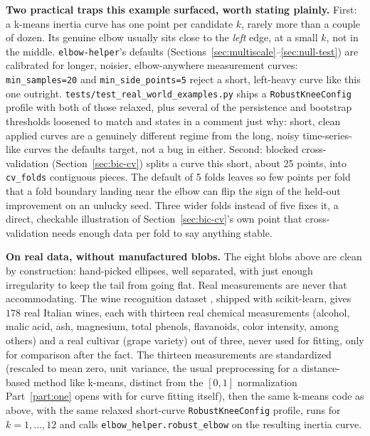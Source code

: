 \documentclass[11pt]{article}
\newcommand{\code}[1]{\texttt{#1}}
\begin{document}
\textbf{Two practical traps this example surfaced, worth stating plainly.}
First: a k-means inertia curve has one point per candidate $k$, rarely more
than a couple of dozen. Its genuine elbow usually sits close to the
\emph{left} edge, at a small $k$, not in the middle. \code{elbow-helper}'s
defaults (Sections~\ref{sec:multiscale}--\ref{sec:null-test}) are calibrated
for longer, noisier, elbow-anywhere measurement curves:
\code{min\_samples=20} and \code{min\_side\_points=5} reject a short,
left-heavy curve like this one outright.
\code{tests/test\_real\_world\_examples.py} ships a \code{RobustKneeConfig}
profile with both of those relaxed, plus several of the persistence and
bootstrap thresholds loosened to match and states in a comment just why:
short, clean applied curves are a genuinely different regime from the long,
noisy time-series-like curves the defaults target, not a bug in either.
Second: blocked cross-validation (Section~\ref{sec:bic-cv}) splits a curve
this short, about 25 points, into \code{cv\_folds} contiguous pieces. The
default of 5 folds leaves so few points per fold that a fold boundary
landing near the elbow can flip the sign of the held-out improvement on an
unlucky seed. Three wider folds instead of five fixes it, a direct,
checkable illustration of Section~\ref{sec:bic-cv}'s own point that
cross-validation needs enough data per fold to say anything stable.

\textbf{On real data, without manufactured blobs.} The eight blobs above
are clean by construction: hand-picked ellipses, well separated, with
just enough irregularity to keep the tail from going flat. Real
measurements are never that accommodating. The wine recognition
dataset \citep{aeberhard1992}, shipped with scikit-learn, gives $178$
real Italian wines, each with thirteen real chemical measurements
(alcohol, malic acid, ash, magnesium, total phenols, flavanoids, color
intensity, among others) and a real cultivar (grape variety) out of
three, never used for fitting, only for comparison after the fact. The
thirteen measurements are standardized (rescaled to mean zero, unit
variance, the usual preprocessing for a distance-based method like
k-means, distinct from the $[0,1]$ normalization Part~\ref{part:one}
opens with for curve fitting itself), then the same k-means code as
above, with the same relaxed short-curve \code{RobustKneeConfig}
profile, runs for $k=1,\dots,12$ and calls
\code{elbow\_helper.robust\_elbow} on the resulting inertia curve.
\end{document}
